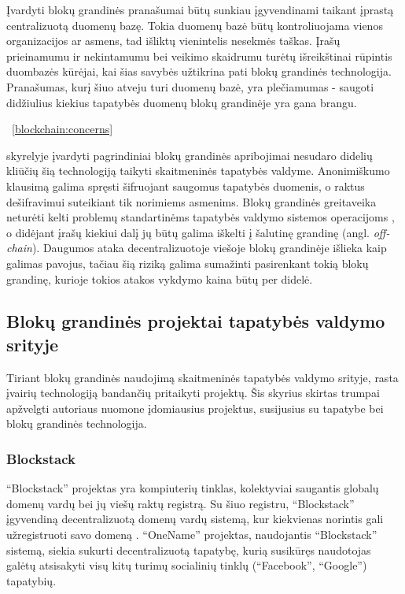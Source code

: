 Įvardyti blokų grandinės pranašumai būtų sunkiau įgyvendinami taikant įprastą centralizuotą duomenų bazę. Tokia duomenų bazė
būtų kontroliuojama vienos organizacijos ar asmens, tad išliktų vienintelis nesekmės taškas. Įrašų prieinamumu ir nekintamumu bei veikimo
skaidrumu
turėtų išreikštinai rūpintis duombazės kūrėjai, kai šias savybės užtikrina pati blokų grandinės technologija. Pranašumas, kurį
šiuo atveju turi duomenų bazė, yra plečiamumas - saugoti didžiulius kiekius tapatybės duomenų blokų grandinėje yra gana brangu.

\hypertarget{blockchain:concerns}{~\ref{blockchain:concerns}} skyrelyje įvardyti pagrindiniai blokų grandinės apribojimai nesudaro didelių kliūčių šią technologiją taikyti skaitmeninės tapatybės valdyme.
Anonimiškumo klausimą galima spręsti šifruojant saugomus tapatybės duomenis,
o raktus dešifravimui suteikiant tik norimiems asmenims. Blokų grandinės greitaveika neturėti kelti problemų
standartinėms tapatybės valdymo sistemos operacijoms \cite{Lo2017}, o didėjant įrašų kiekiui dalį jų būtų galima iškelti į
šalutinę grandinę (angl. \textit{off-chain}). Daugumos ataka decentralizuotoje viešoje blokų grandinėje išlieka kaip galimas pavojus,
tačiau šią riziką galima sumažinti pasirenkant tokią blokų grandinę, kurioje tokios atakos vykdymo kaina būtų per didelė.

\subsection{Blokų grandinės projektai tapatybės valdymo srityje} \label{section:relatedWork}

Tiriant blokų grandinės naudojimą skaitmeninės tapatybės valdymo srityje, rasta įvairių
technologiją bandančių pritaikyti projektų. Šis skyrius skirtas trumpai apžvelgti autoriaus nuomone
įdomiausius projektus, susijusius su tapatybe bei blokų grandinės technologija.

\subsubsection{Blockstack}

\enquote{Blockstack} projektas yra kompiuterių tinklas, kolektyviai saugantis globalų
domenų vardų bei jų viešų raktų registrą. Su šiuo registru, \enquote{Blockstack} įgyvendiną
decentralizuotą domenų vardų sistemą, kur kiekvienas norintis gali užregistruoti savo domeną \cite{BlockstackWhitepaper}.
\enquote{OneName} projektas, naudojantis \enquote{Blockstack} sistemą, siekia sukurti decentralizuotą tapatybę,
kurią susikūręs naudotojas galėtų atsisakyti visų kitų turimų socialinių tinklų (\enquote{Facebook},
\enquote{Google}) tapatybių.

